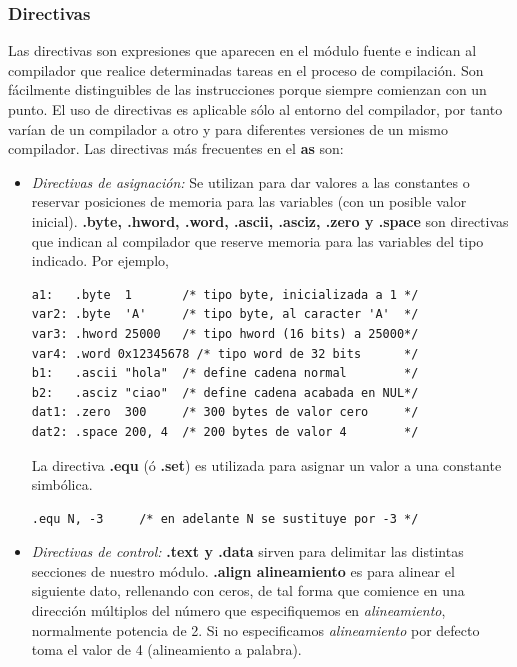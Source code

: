 \subsubsection{Directivas}

Las directivas son expresiones que aparecen en el módulo fuente e
indican al compilador que realice determinadas tareas en el proceso
de compilación. Son fácilmente distinguibles de las instrucciones
porque siempre comienzan con un punto. El uso de directivas es
aplicable sólo al entorno del compilador, por tanto varían de un
compilador a otro y para diferentes versiones de un mismo compilador.
Las directivas más frecuentes en el {\bf as} son:

\begin{itemize}
        \item \textit{Directivas de asignación:} Se utilizan para dar
valores a las constantes o reservar posiciones de memoria para las
variables (con un posible valor inicial).  \textbf{.byte, .hword, .word,
.ascii, .asciz, .zero y .space}
son directivas que indican al compilador que reserve memoria para
las variables del tipo indicado. Por ejemplo,

\begin{lstlisting}
a1:   .byte  1       /* tipo byte, inicializada a 1 */
var2: .byte  'A'     /* tipo byte, al caracter 'A'  */
var3: .hword 25000   /* tipo hword (16 bits) a 25000*/
var4: .word 0x12345678 /* tipo word de 32 bits      */
b1:   .ascii "hola"  /* define cadena normal        */
b2:   .asciz "ciao"  /* define cadena acabada en NUL*/
dat1: .zero  300     /* 300 bytes de valor cero     */
dat2: .space 200, 4  /* 200 bytes de valor 4        */
\end{lstlisting}

La directiva \textbf{.equ} (ó \textbf{.set}) es utilizada para asignar un
valor a una constante simbólica.

\begin{lstlisting}
.equ N, -3     /* en adelante N se sustituye por -3 */
\end{lstlisting}

\item \textit{Directivas de control:}
        \textbf{.text y .data} sirven para delimitar las distintas secciones
        de nuestro módulo.
        \textbf{.align {alineamiento}} es para alinear el siguiente dato,
        rellenando con ceros, de tal forma que comience en una dirección
        múltiplos del número que especifiquemos en {\it alineamiento},
        normalmente potencia de 2. Si no especificamos {\it alineamiento}
        por defecto toma el valor de 4 (alineamiento a palabra).


\end{itemize}
